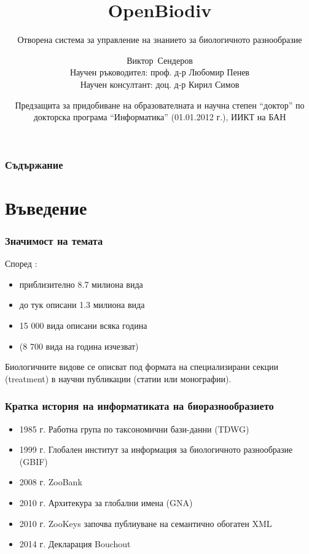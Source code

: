 \documentclass[bulgarian]{beamer}
\title[OpenBiodiv] %
{OpenBiodiv}
\subtitle{Отворена система за управление на знанието за биологичното разнообразие}
\author[Сендеров, Виктор] %
{Виктор~Сендеров\\{\tiny Научен ръководител: проф. д-р Любомир Пенев\inst{1}}\\{\tiny Научен консултант: доц. д-р Кирил Симов\inst{2}}}
\institute[] %
{
  \inst{1}%
  Академично издателство ``Пенсофт''\\
  \and
  \inst{2}%
  Институт по информационни и комуникационни технологии\\
  Бъгларска академия на науките
}
\date[18.12.2018] %
{Предзащита за придобиване на образователната и научна степен ``доктор'' по докторска програма ``Информатика'' (01.01.2012 г.), ИИКТ на БАН}
\begin{document}
\frame{\titlepage}


\begin{frame}
\frametitle{Съдържание}
\tableofcontents
\end{frame}


\section{Въведение}

\begin{frame}
\frametitle{Значимост на темата}
Според \cite{mora_how_2011}:
\begin{itemize}
    \item приблизително 8.7 милиона вида
    \item до тук описани 1.3 милиона вида
    \item 15 000 вида описани всяка година
    \item (8 700 вида на година изчезват)
\end{itemize}
 
\vspace{5mm}

Биологичните видове се описват под формата на специализирани секции (treatment) в научни публикации (статии или монографии).

\end{frame}

\begin{frame}
\frametitle{Кратка история на информатиката на биоразнообразието}

\begin{itemize}
    \item 1985 г. Работна група по таксономични бази-данни (TDWG)
    \item 1999 г. Глобален институт за информация за биологичното разнообразие (GBIF)
    \item 2008 г. ZooBank
    \item 2010 г. Архитекура за глобални имена (GNA)
    \item 2010 г. ZooKeys започва публиуване на семантично обогатен XML
    \item 2014 г. Декларация Bouchout
\end{itemize}

\end{frame}
\end{document}
